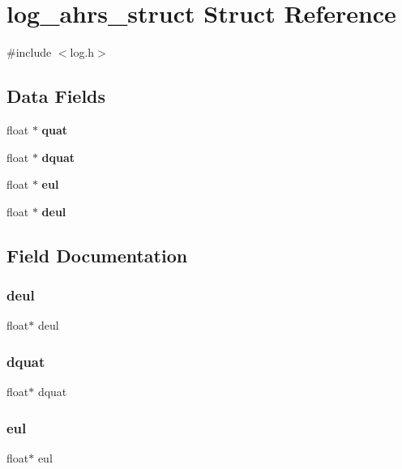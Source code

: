 \section{log\+\_\+ahrs\+\_\+struct Struct Reference}
\label{structlog__ahrs__struct}


{\ttfamily \#include $<$log.\+h$>$}

\subsection*{Data Fields}
\begin{DoxyCompactItemize}
\item 
float $\ast$ \textbf{ quat}
\item 
float $\ast$ \textbf{ dquat}
\item 
float $\ast$ \textbf{ eul}
\item 
float $\ast$ \textbf{ deul}
\end{DoxyCompactItemize}


\subsection{Field Documentation}
\mbox{\label{structlog__ahrs__struct_a282ccbfe2541b741108160a9385814ef}} 
\subsubsection{deul}
{\footnotesize\ttfamily float$\ast$ deul}

\mbox{\label{structlog__ahrs__struct_a29c7709785118a3dcd62f67c92d05f23}} 
\subsubsection{dquat}
{\footnotesize\ttfamily float$\ast$ dquat}

\mbox{\label{structlog__ahrs__struct_a40cb0e5dccbe202fbd8a7d6c66668e1f}} 
\subsubsection{eul}
{\footnotesize\ttfamily float$\ast$ eul}

